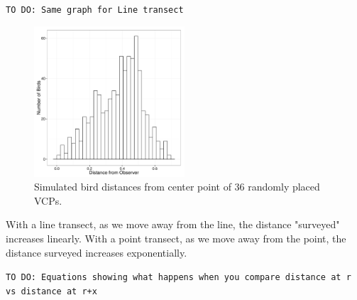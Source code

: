 \documentclass[12pt]{article}
\begin{document}
\texttt{TO DO: Same graph for Line transect}

\begin{figure}
	\center
	\includegraphics[width=0.5\textwidth]{../images/simulated_bird_distances.pdf}
	\caption{Simulated bird distances from center point of 36 randomly placed VCPs.\label{fig:simDist}}
		
\end{figure}

With a line transect, as we move away from the line, the distance "surveyed" increases linearly. With a point transect, as we move away from the point, the distance surveyed increases exponentially. 

\texttt{TO DO: Equations showing what happens when you compare distance at r vs distance at r+x}
\end{document}
